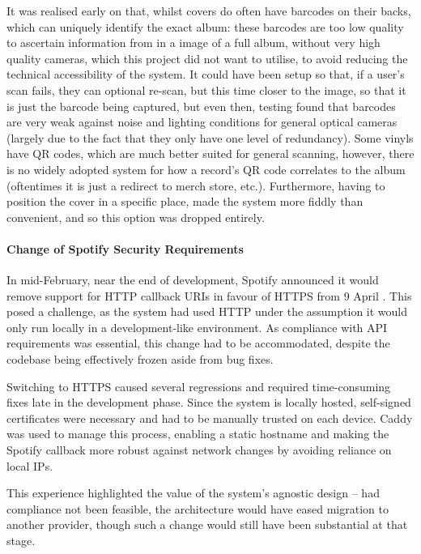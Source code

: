                 It was realised early on that, whilst covers do often have barcodes on their backs, which can uniquely identify the exact album: these barcodes are too low quality to ascertain information from in a image of a full album, without very high quality cameras, which this project did not want to utilise, to avoid reducing the technical accessibility of the system. It could have been setup so that, if a user's scan fails, they can optional re-scan, but this time closer to the image, so that it is just the barcode being captured, but even then, testing found that barcodes are very weak against noise and lighting conditions for general optical cameras (largely due to the fact that they only have one level of redundancy). Some vinyls have QR codes, which are much better suited for general scanning, however, there is no widely adopted system for how a record's QR code correlates to the album (oftentimes it is just a redirect to merch store, etc.). Furthermore, having to position the cover in a specific place, made the system more fiddly than convenient, and so this option was dropped entirely.
    
                \paragraph{Change of Spotify Security Requirements}
    
                In mid-February, near the end of development, Spotify announced it would remove support for HTTP callback URIs in favour of HTTPS from 9 April \cite{spotify2025security}. This posed a challenge, as the system had used HTTP under the assumption it would only run locally in a development-like environment. As compliance with API requirements was essential, this change had to be accommodated, despite the codebase being effectively frozen aside from bug fixes.
    
                Switching to HTTPS caused several regressions and required time-consuming fixes late in the development phase. Since the system is locally hosted, self-signed certificates were necessary and had to be manually trusted on each device. Caddy was used to manage this process, enabling a static hostname and making the Spotify callback more robust against network changes by avoiding reliance on local IPs.
    
                This experience highlighted the value of the system’s agnostic design -- had compliance not been feasible, the architecture would have eased migration to another provider, though such a change would still have been substantial at that stage.
    
